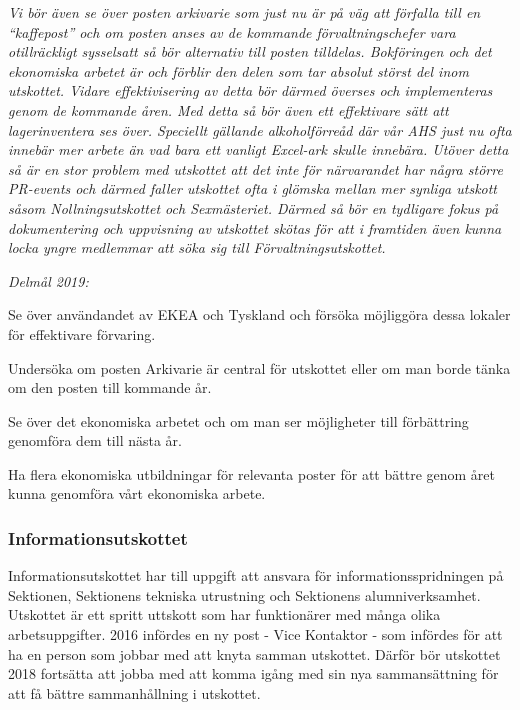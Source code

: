 \documentclass[../_main/handlingar.tex]{subfiles}
\begin{document}
\textit{Vi bör även se över posten arkivarie som just nu är på väg att förfalla till en “kaffepost” och om posten anses av de kommande förvaltningschefer vara otillräckligt sysselsatt så bör alternativ till posten tilldelas.
Bokföringen och det ekonomiska arbetet är och förblir den delen som tar absolut störst del inom utskottet. Vidare effektivisering av detta bör därmed överses och implementeras genom de kommande åren.
Med detta så bör även ett effektivare sätt att lagerinventera ses över. Speciellt gällande alkoholförreåd där vår AHS just nu ofta innebär mer arbete än vad bara ett vanligt Excel-ark skulle innebära.
Utöver detta så är en stor problem med utskottet att det inte för närvarandet har några större PR-events och därmed faller utskottet ofta i glömska mellan mer synliga utskott såsom Nollningsutskottet och Sexmästeriet. Därmed så bör en tydligare fokus på dokumentering och uppvisning av utskottet skötas för att i framtiden även kunna locka yngre medlemmar att söka sig till Förvaltningsutskottet.
}

\emph{Delmål 2019:}
\begin{dashlist}
	\item Se över användandet av EKEA och Tyskland och försöka möjliggöra dessa lokaler för effektivare förvaring.
	\item Undersöka om posten Arkivarie är central för utskottet eller om man borde tänka om den posten till kommande år.
	\item Se över det ekonomiska arbetet och om man ser möjligheter till förbättring genomföra dem till nästa år.
	\item Ha flera ekonomiska utbildningar för relevanta poster för att bättre genom året kunna genomföra vårt ekonomiska arbete.
\end{dashlist}

\newpage

\subsubsection*{Informationsutskottet}
Informationsutskottet har till uppgift att ansvara för informationsspridningen på Sektionen, Sektionens tekniska utrustning och Sektionens alumniverksamhet. Utskottet är ett spritt uttskott som har funktionärer med många olika arbetsuppgifter. 2016 infördes en ny post - Vice Kontaktor - som infördes för att ha en person som jobbar med att knyta samman utskottet. Därför bör utskottet 2018 fortsätta att jobba med att komma igång med sin nya sammansättning för att få bättre sammanhållning i utskottet.
\end{document}
